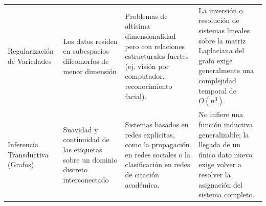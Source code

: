 \begin{table}[ht]
\begin{tabular}{
  >{\raggedright\arraybackslash}p{3cm} 
  >{\raggedright\arraybackslash}p{4cm} 
  >{\raggedright\arraybackslash}p{4cm} 
  >{\raggedright\arraybackslash}p{4cm}
}
Regularización de Variedades & Los datos residen en subespacios difeomorfos de menor dimensión & Problemas de altísima dimensionalidad pero con relaciones estructurales fuertes (ej. visión por computador, reconocimiento facial). & La inversión o resolución de sistemas lineales sobre la matriz Laplaciana del grafo exige generalmente una complejidad temporal de $O(n^3)$. \\ 
\addlinespace

Inferencia Transductiva (Grafos) & Suavidad y continuidad de las etiquetas sobre un dominio discreto interconectado & Sistemas basados en redes explícitas, como la propagación en redes sociales o la clasificación en redes de citación académica. & No infiere una función inductiva generalizable; la llegada de un único dato nuevo exige volver a resolver la asignación del sistema completo. \\ 

\bottomrule
\end{tabular}
\end{table}